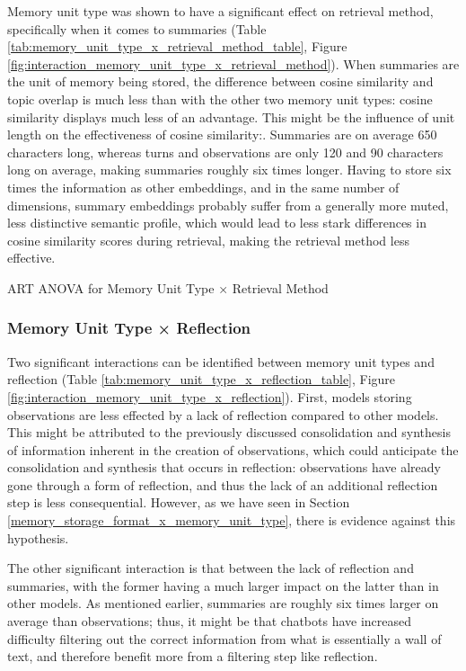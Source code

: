 Memory unit type was shown to have a significant effect on retrieval method, specifically when it comes to summaries (Table \ref{tab:memory_unit_type_x_retrieval_method_table}, Figure \ref{fig:interaction_memory_unit_type_x_retrieval_method}). When summaries are the unit of memory being stored, the difference between cosine similarity and topic overlap is much less than with the other two memory unit types: cosine similarity displays much less of an advantage. This might be the influence of unit length on the effectiveness of cosine similarity:. Summaries are on average 650 characters long, whereas turns and observations are only 120 and 90 characters long on average, making summaries roughly six times longer. Having to store six times the information as other embeddings, and in the same number of dimensions, summary embeddings probably suffer from a generally more muted, less distinctive semantic profile, which would lead to less stark differences in cosine similarity scores during retrieval, making the retrieval method less effective.

\begin{table}[htbp]
\centering
\tiny

\caption{ART ANOVA for Memory Unit Type × Retrieval Method}
\label{tab:memory_unit_type_x_retrieval_method_table}
\end{table}


\subsubsection{Memory Unit Type × Reflection}

Two significant interactions can be identified between memory unit types and reflection (Table \ref{tab:memory_unit_type_x_reflection_table}, Figure \ref{fig:interaction_memory_unit_type_x_reflection}). First, models storing observations are less effected by a lack of reflection compared to other models. This might be attributed to the previously discussed consolidation and synthesis of information inherent in the creation of observations, which could anticipate the consolidation and synthesis that occurs in reflection: observations have already gone through a form of reflection, and thus the lack of an additional reflection step is less consequential. However, as we have seen in Section \ref{memory_storage_format_x_memory_unit_type}, there is evidence against this hypothesis.

The other significant interaction is that between the lack of reflection and summaries, with the former having a much larger impact on the latter than in other models. As mentioned earlier, summaries are roughly six times larger on average than observations; thus, it might be that chatbots have increased difficulty filtering out the correct information from what is essentially a wall of text, and therefore benefit more from a filtering step like reflection.

